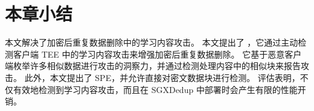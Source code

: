 \section{本章小结}
\label{sec:featurespy-conclusion}
本文解决了加密后重复数据删除中的学习内容攻击。 本文提出了 \sysnameF，它通过主动检测客户端 TEE 中的学习内容攻击来增强加密后重复数据删除。 它基于恶意客户端枚举许多相似数据进行攻击的洞察力，并通过检测处理内容中的相似块来报告攻击。 此外，本文提出了 SPE，并允许直接对密文数据块进行检测。 评估表明，\sysnameF 不仅有效地检测到学习内容攻击，而且在 SGXDedup \cite{ren21} 中部署时会产生有限的性能开销。
